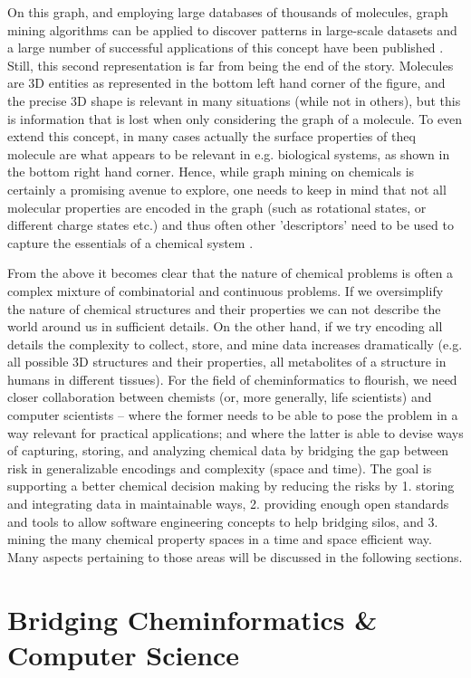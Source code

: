 \documentclass{sig-alternate}
\begin{document}
On this graph, and employing large databases of thousands of molecules, graph
mining algorithms can be applied to discover patterns in large-scale datasets
and a large number of successful applications of this concept have been
published \cite{wegner2006,horst2009}. Still, this second representation is far
from being the end of the story. Molecules are 3D entities as represented in the
bottom left hand corner of the figure, and the precise 3D shape is relevant in
many situations (while not in others), but this is information that is lost when
only considering the graph of a molecule. To even extend this concept, in many
cases actually the surface properties of theq molecule are what appears to be
relevant in e.g. biological systems, as shown in the bottom right hand corner.
Hence, while graph mining on chemicals is certainly a promising avenue to
explore, one needs to keep in mind that not all molecular properties are encoded
in the graph (such as rotational states, or different charge states etc.) and
thus often other 'descriptors' need to be used to capture the essentials of a
chemical system \cite{bender2004}.

From the above it becomes clear that the nature of chemical problems is often a
complex mixture of combinatorial and continuous problems. If we oversimplify the
nature of chemical structures and their properties we can not describe the world
around us in sufficient details. On the other hand, if we try encoding all
details the complexity to collect, store, and mine data increases dramatically
(e.g. all possible 3D structures and their properties, all metabolites of a
structure in humans in different tissues). For the field of cheminformatics to
flourish, we need closer collaboration between chemists (or, more generally,
life scientists) and computer scientists – where the former needs to be able to
pose the problem in a way relevant for practical applications; and where the
latter is able to devise ways of capturing, storing, and analyzing chemical data
by bridging the gap between risk in generalizable encodings and complexity
(space and time). The goal is supporting a better chemical decision making by
reducing the risks by 1. storing and integrating data in maintainable ways, 2.
providing enough open standards and tools to allow software engineering concepts
to help bridging silos, and 3. mining the many chemical property spaces in a
time and space efficient way. Many aspects pertaining to those areas will be
discussed in the following sections.

\section{Bridging Cheminformatics \& Computer Science}
\end{document}
